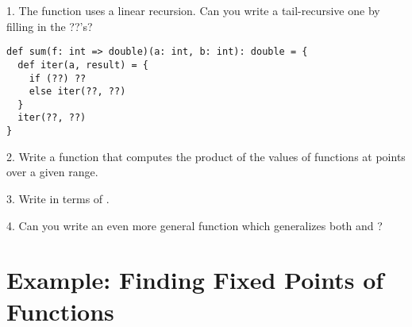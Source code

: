 \documentclass[a4paper,12pt,twoside,titlepage]{book}
\begin{document}
1. The  function uses a linear recursion. Can you write a
tail-recursive one by filling in the ??'s?

\begin{lstlisting}
def sum(f: int => double)(a: int, b: int): double = {
  def iter(a, result) = {
    if (??) ??
    else iter(??, ??)
  }
  iter(??, ??)
}
\end{lstlisting}

2. Write a function  that computes the product of the
values of functions at points over a given range.

3. Write  in terms of .

4. Can you write an even more general function which generalizes both
 and ?

\section{Example: Finding Fixed Points of Functions}
\end{document}
